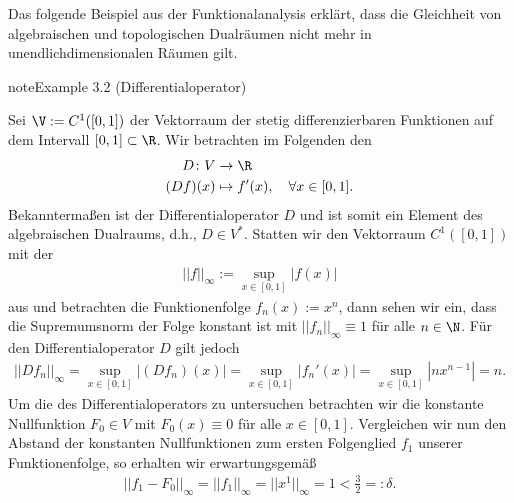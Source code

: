 \documentclass[letterpaper,10pt,english]{jupyterBook}
\begin{document}
\sphinxAtStartPar
Das folgende Beispiel aus der Funktionalanalysis erklärt, dass die Gleichheit von algebraischen und topologischen Dualräumen nicht mehr in unendlich\sphinxhyphen{}dimensionalen Räumen gilt.
\label{vektoranalysis/multilinear:example-5}
\begin{sphinxadmonition}{note}{Example 3.2 (Differentialoperator)}



\sphinxAtStartPar
Sei \(\V := C^1([0,1])\) der Vektorraum der stetig differenzierbaren Funktionen auf dem Intervall \([0,1] \subset \R\).
Wir betrachten im Folgenden den 
\begin{equation*}
\begin{split}D \colon V &\rightarrow \R \\
(Df)(x) &\mapsto f'(x), \quad \forall x \in [0,1].\end{split}
\end{equation*}
\sphinxAtStartPar
Bekanntermaßen ist der Differentialoperator \(D\)  und ist somit ein Element des algebraischen Dualraums, d.h., \(D \in V^\ast\).
Statten wir den Vektorraum \(C^1([0,1])\) mit der 
\begin{equation*}
\begin{split}||f||_\infty := \sup_{x \in [0,1]} |f(x)|\end{split}
\end{equation*}
\sphinxAtStartPar
aus und betrachten die Funktionenfolge \(f_n(x) := x^n\), dann sehen wir ein, dass die Supremumsnorm der Folge konstant ist mit \(||f_n||_\infty \equiv 1\) für alle \(n\in\N\).
Für den Differentialoperator \(D\) gilt jedoch
\begin{equation*}
\begin{split}||Df_n||_\infty = \sup_{x \in [0,1]} |(Df_n)(x)| = \sup_{x \in [0,1]} |f_n'(x)| = \sup_{x \in [0,1]} |nx^{n-1}| = n.\end{split}
\end{equation*}
\sphinxAtStartPar
Um die  des Differentialoperators zu untersuchen betrachten wir die konstante Nullfunktion \(F_0 \in V\) mit \(F_0(x) \equiv 0\) für alle \(x \in [0,1]\).
Vergleichen wir nun den Abstand der konstanten Nullfunktionen zum ersten Folgenglied \(f_1\) unserer Funktionenfolge, so erhalten wir erwartungsgemäß
\begin{equation*}
\begin{split}||f_1 - F_0||_\infty = ||f_1||_\infty = ||x^1||_\infty = 1 < \frac{3}{2} =: \delta.\end{split}

\end{equation*}
\end{sphinxadmonition}
\end{document}

